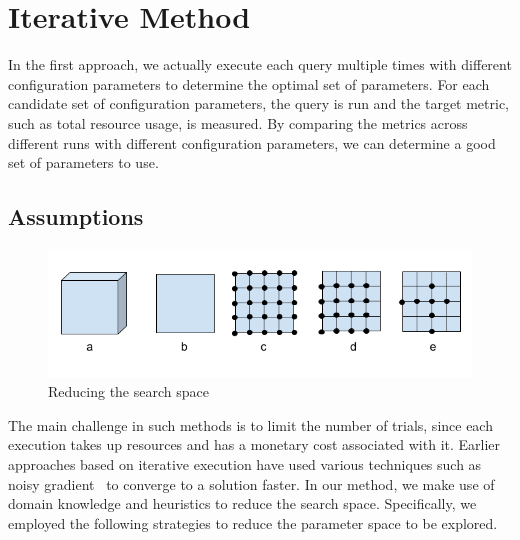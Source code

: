 \section{Iterative Method} \label{section:iter}
In the first approach, we actually execute each query multiple times with different configuration parameters to determine the optimal set of parameters. For each candidate set of configuration parameters, the query is run and the target metric, such as total resource usage, is measured. By comparing the metrics across different runs with different configuration parameters, we can determine a good set of parameters to use. 

\subsection{Assumptions}
\label{sec:assumptions}
\begin{figure}[h]
	\includegraphics[width=\linewidth]{fig/searchspace.png}
	\caption{Reducing the search space}
	\label{fig:searchspace}
\end{figure}


The main challenge in such methods is to limit the number of trials, since each execution takes up resources and has a monetary cost associated with it. Earlier approaches based on iterative execution have used various techniques such as noisy gradient~\cite{KumarPLPGB16} to converge to a solution faster. In our method, we make use of domain knowledge and heuristics to reduce the search space. Specifically, we employed the following strategies to reduce the parameter space to be explored.

